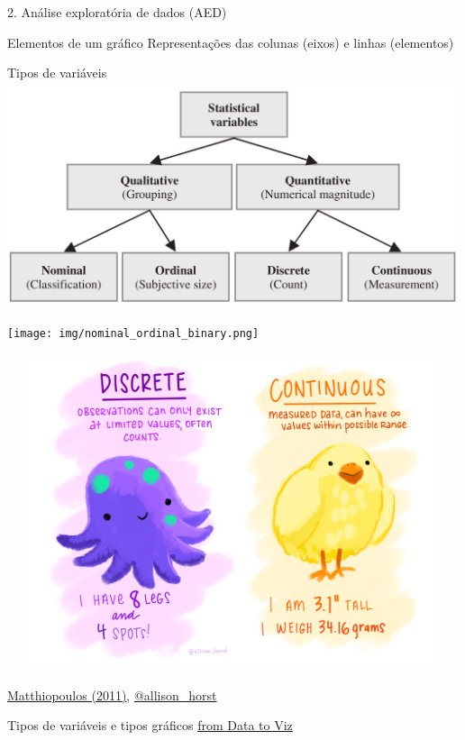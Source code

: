 \documentclass[
  ignorenonframetext,
]{beamer}
\begin{document}
\begin{frame}[fragile]{2. Análise exploratória de dados (AED)}
\begin{block}{Elementos de um gráfico}
\protect\hypertarget{elementos-de-um-gruxe1fico}{}
Representações das colunas (eixos) e linhas (elementos)
\end{block}

\begin{block}{Tipos de variáveis}
\protect\hypertarget{tipos-de-variuxe1veis}{}
\includegraphics[width=5.20833in,height=2.60417in]{img/plot_variables.png}

\texttt{[image: img/nominal\_ordinal\_binary.png]}

\includegraphics[width=5.20833in,height=3.64583in]{img/continuous_discrete_inv.png}

\href{http://greenmaths.st-andrews.ac.uk/}{Matthiopoulos (2011)},
\href{https://twitter.com/allison_horst}{@allison\_horst}
\end{block}

\begin{block}{Tipos de variáveis e tipos gráficos}
\protect\hypertarget{tipos-de-variuxe1veis-e-tipos-gruxe1ficos}{}
\href{https://www.data-to-viz.com/}{from Data to Viz}
\end{block}


\end{frame}
\end{document}
